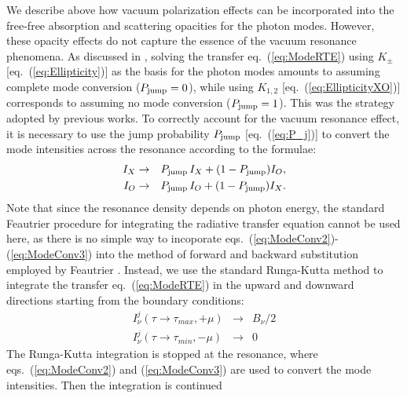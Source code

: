\documentclass[useAMS,onecolumn,usenatbib,usegraphicx]{mn2e}
\begin{document}
We describe above how vacuum polarization effects can be incorporated into the 
free-free absorption and scattering opacities for the photon modes.  
However, these opacity effects do not capture the essence of the vacuum resonance phenomena.  As discussed in 
\citet[][]{LaiHo03a}, solving the transfer eq.~(\ref{eq:ModeRTE}) 
using $K_{\pm}$ [eq.~(\ref{eq:Ellipticity})] as the 
basis for the photon modes amounts to assuming complete mode conversion ($P_{\rm jump}=0$), 
while using $K_{1,2}$ [eq.~(\ref{eq:EllipticityXO})] 
corresponds to assuming no mode conversion ($P_{\rm jump}=1$).  This was the strategy adopted by previous works.
To correctly account for the vacuum resonance effect, it is necessary to use the jump probability $P_{\rm jump}$
[eq.~(\ref{eq:P_j})]
to convert the mode intensities across the resonance according to the formulae:
\begin{eqnarray}
\label{eq:ModeConv2}
I_X & \rightarrow & P_{\rm jump}\, I_X + (1-P_{\rm jump}) I_O,\\
\label{eq:ModeConv3}
I_O & \rightarrow & P_{\rm jump}\, I_O + (1-P_{\rm jump}) I_X.
\end{eqnarray}
Note that since the resonance density depends on photon energy, the standard Feautrier procedure for integrating the radiative 
transfer equation cannot be used here, as there is no simple way 
to incoporate eqs.~(\ref{eq:ModeConv2})-(\ref{eq:ModeConv3}) into the 
method of forward and 
backward substitution employed by Feautrier \citep[see][\S 6-3]{Mihalas78a}.
Instead, we use the standard Runga-Kutta method to integrate the transfer 
eq.~(\ref{eq:ModeRTE}) in the upward and downward directions starting from the boundary 
conditions:
\begin{eqnarray}
I_{\nu}^j(\tau\rightarrow\tau_{max},+\mu) & \rightarrow & B_{\nu}/2\\
I_{\nu}^j(\tau\rightarrow\tau_{min},-\mu) & \rightarrow & 0
\end{eqnarray}
The Runga-Kutta integration is stopped at the resonance, where eqs.~(\ref{eq:ModeConv2}) and 
(\ref{eq:ModeConv3}) are used to convert the mode intensities.  Then the integration is continued 
\end{document}
